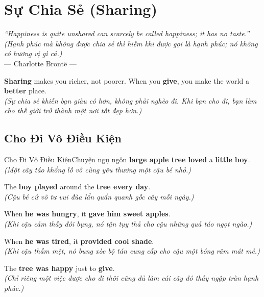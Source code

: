 \chapter{Sự Chia Sẻ (Sharing)}

\begin{center}
  \textit{\color{truyenblue}``Happiness is quite unshared can scarcely be called happiness; it has no taste.''}\\
  \textit{(Hạnh phúc mà không được chia sẻ thì hiếm khi được gọi là hạnh phúc; nó không có hương vị gì cả.)}\\[4pt]
  \small\color{truyengold}--- Charlotte Brontë ---
\end{center}

\ngancach

\begin{tcolorbox}[
  colback=truyenred!5, colframe=truyenred!40, arc=6pt,
  title={\bfseries Trái Tim Rộng Mở (An Open Heart)},
  fonttitle=\bfseries\color{truyenred}
]
  \textbf{Sharing} makes you richer, not poorer. When you \textbf{give}, you make the world a \textbf{better} place.
  \\ \textit{(Sự chia sẻ khiến bạn giàu có hơn, không phải nghèo đi. Khi bạn cho đi, bạn làm cho thế giới trở thành một nơi tốt đẹp hơn.)}
\end{tcolorbox}

\vspace{0.6cm}


\ngayDay{}
\section{Cho Đi Vô Điều Kiện}
\begin{truyen}{Cho Đi Vô Điều Kiện}{Chuyện ngụ ngôn}
 \textbf{large apple tree loved} a \textbf{little boy}.\\
\textit{(Một cây táo khổng lồ vô cùng yêu thương một cậu bé nhỏ.)}

The \textbf{boy played} around the \textbf{tree every day}.\\
\textit{(Cậu bé cứ vô tư vui đùa lẩn quẩn quanh gốc cây mỗi ngày.)}

When \textbf{he was hungry}, it \textbf{gave him sweet apples}.\\
\textit{(Khi cậu cảm thấy đói bụng, nó tận tụy thả cho cậu những quả táo ngọt ngào.)}

When \textbf{he was tired}, it \textbf{provided cool shade}.\\
\textit{(Khi cậu thấm mệt, nó bung xòe bộ tán cung cấp cho cậu một bóng râm mát mẻ.)}

The \textbf{tree was happy} just to \textbf{give}.\\
\textit{(Chỉ riêng một việc được cho đi thôi cũng đủ làm cái cây đó thấy ngập tràn hạnh phúc.)}
\end{truyen}

